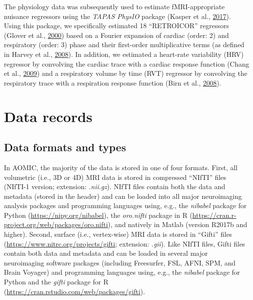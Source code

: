 \documentclass[11pt,american,a4paper,oneside,]{memoir} %
\begin{document}
The physiology data was subsequently used to estimate fMRI-appropriate nuisance regressors using the \emph{TAPAS PhysIO} package (Kasper et al., \protect\hyperlink{ref-Kasper2017-lp}{2017}). Using this package, we specifically estimated 18 ``RETROICOR'' regressors (Glover et al., \protect\hyperlink{ref-Glover2000-or}{2000}) based on a Fourier expansion of cardiac (order: 2) and respiratory (order: 3) phase and their first-order multiplicative terms (as defined in Harvey et al., \protect\hyperlink{ref-Harvey2008-nt}{2008}). In addition, we estimated a heart-rate variability (HRV) regressor by convolving the cardiac trace with a cardiac response function (Chang et al., \protect\hyperlink{ref-Chang2009-vu}{2009}) and a respiratory volume by time (RVT) regressor by convolving the respiratory trace with a respiration response function (Birn et al., \protect\hyperlink{ref-Birn2008-ti}{2008}).

\hypertarget{data-records}{%
\section{Data records}\label{data-records}}

\hypertarget{data-formats-and-types}{%
\subsection{Data formats and types}\label{data-formats-and-types}}

In AOMIC, the majority of the data is stored in one of four formats. First, all volumetric (i.e., 3D or 4D) MRI data is stored in compressed ``NIfTI'' files (NIfTI-1 version; extension: \emph{.nii.gz}). NIfTI files contain both the data and metadata (stored in the header) and can be loaded into all major neuroimaging analysis packages and programming languages using, e.g., the \emph{nibabel} package for Python (\url{https://nipy.org/nibabel}), the \emph{oro.nifti} package in R (\url{https://cran.r-project.org/web/packages/oro.nifti}), and natively in Matlab (version R2017b and higher). Second, surface (i.e., vertex-wise) MRI data is stored in ``Gifti'' files (\url{https://www.nitrc.org/projects/gifti}; extension: \emph{.gii}). Like NIfTI files, Gifti files contain both data and metadata and can be loaded in several major neuroimaging software packages (including Freesurfer, FSL, AFNI, SPM, and Brain Voyager) and programming languages using, e.g., the \emph{nibabel} package for Python and the \emph{gifti} package for R (\url{https://cran.rstudio.com/web/packages/gifti}).
\end{document}
